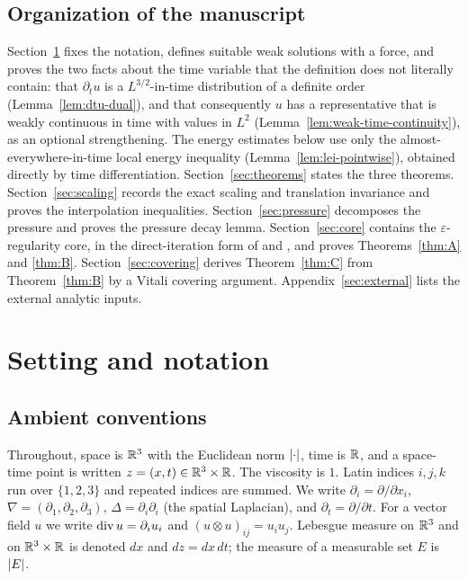 \documentclass[11pt,reqno]{amsart}
\begin{document}
\subsection*{Organization of the manuscript}
Section~\ref{sec:setting} fixes the notation, defines suitable weak solutions
with a force, and proves the two facts about the time variable that the
definition does not literally contain: that $\partial_{t}u$ is a
$L^{3/2}$-in-time distribution of a definite order (Lemma~\ref{lem:dtu-dual}),
and that consequently $u$ has a representative that is weakly continuous in time
with values in $L^{2}$ (Lemma~\ref{lem:weak-time-continuity}), as an optional strengthening. The energy estimates below use only the
almost-everywhere-in-time local energy inequality
(Lemma~\ref{lem:lei-pointwise}), obtained directly by time differentiation. Section~\ref{sec:theorems} states the three
theorems. Section~\ref{sec:scaling} records the exact scaling and translation
invariance and proves the interpolation inequalities.
Section~\ref{sec:pressure} decomposes the pressure and proves the pressure decay
lemma. Section~\ref{sec:core} contains the
$\varepsilon$-regularity core, in the direct-iteration form of
\cite{Kukavica2008} and \cite[\S13.8--13.9]{LemarieRieusset2016}, and proves
Theorems~\ref{thm:A} and \ref{thm:B}. Section~\ref{sec:covering} derives
Theorem~\ref{thm:C} from Theorem~\ref{thm:B} by a Vitali covering argument.
Appendix~\ref{sec:external} lists the external analytic inputs.

\section{Setting and notation}\label{sec:setting}

\subsection{Ambient conventions}\label{ss:ambient}

Throughout, space is $\mathbb{R}^{3}$ with the Euclidean norm $\left\lvert \cdot \right\rvert$, time is
$\mathbb{R}$, and a space-time point is written $z=(x,t)\in\mathbb{R}^{3}\times\mathbb{R}$. The
viscosity is $1$. Latin indices $i,j,k$ run over $\{1,2,3\}$ and repeated
indices are summed. We write $\partial_{i}=\partial/\partial x_{i}$,
$\nabla=(\partial_{1},\partial_{2},\partial_{3})$,
$\Delta=\partial_{i}\partial_{i}$ (the spatial Laplacian), and
$\partial_{t}=\partial/\partial t$. For a vector field $u$ we write
$\operatorname{div} u=\partial_{i}u_{i}$ and $(u\otimes u)_{ij}=u_{i}u_{j}$. Lebesgue measure
on $\mathbb{R}^{3}$ and on $\mathbb{R}^{3}\times\mathbb{R}$ is denoted $dx$ and $dz=dx\,dt$; the measure
of a measurable set $E$ is $\left\lvert E \right\rvert$.
\end{document}
